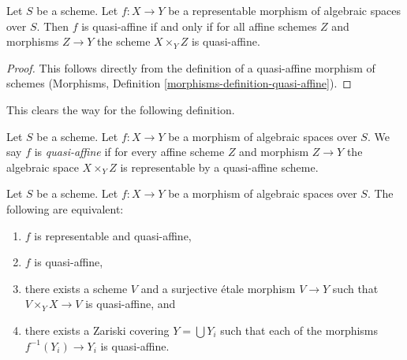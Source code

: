 \begin{lemma}
\label{lemma-quasi-affine-representable}
Let $S$ be a scheme. Let $f : X \to Y$ be a representable
morphism of algebraic spaces over $S$. Then
$f$ is quasi-affine if and only if for all affine schemes $Z$
and morphisms $Z \to Y$ the scheme $X \times_Y Z$ is quasi-affine.
\end{lemma}

\begin{proof}
This follows directly from the definition of a quasi-affine morphism
of schemes
(Morphisms, Definition \ref{morphisms-definition-quasi-affine}).
\end{proof}

\noindent
This clears the way for the following definition.

\begin{definition}
\label{definition-quasi-affine}
Let $S$ be a scheme.
Let $f : X \to Y$ be a morphism of algebraic spaces over $S$.
We say $f$ is {\it quasi-affine} if for every affine scheme $Z$ and
morphism $Z \to Y$ the algebraic space $X \times_Y Z$ is representable
by a quasi-affine scheme.
\end{definition}

\begin{lemma}
\label{lemma-quasi-affine-local}
Let $S$ be a scheme.
Let $f : X \to Y$ be a morphism of algebraic spaces over $S$.
The following are equivalent:
\begin{enumerate}
\item $f$ is representable and quasi-affine,
\item $f$ is quasi-affine,
\item there exists a scheme $V$ and a surjective \'etale morphism
$V \to Y$ such that $V \times_Y X \to V$ is quasi-affine, and
\item there exists a Zariski covering $Y = \bigcup Y_i$ such
that each of the morphisms $f^{-1}(Y_i) \to Y_i$ is quasi-affine.
\end{enumerate}
\end{lemma}

